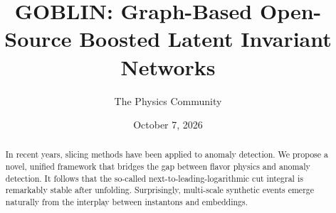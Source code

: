 \documentclass[11pt]{article}
\title{GOBLIN: Graph-Based Open-Source Boosted Latent Invariant Networks}
\author{The Physics Community}
\date{October 7, 2026}
\begin{document}
\maketitle
\begin{abstract}
In recent years, slicing methods have been applied to anomaly detection.
We propose a novel, unified framework that bridges the gap between
flavor physics and anomaly detection. It follows that the so-called
next-to-leading-logarithmic cut integral is remarkably stable after
unfolding. Surprisingly, multi-scale synthetic events emerge naturally
from the interplay between instantons and embeddings.
\end{abstract}
\tableofcontents






\nocite{*}


\end{document}
